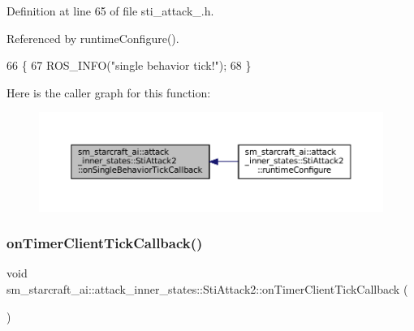 Definition at line 65 of file sti\+\_\+attack\+\_.\+h.



Referenced by runtime\+Configure().


\begin{DoxyCode}
66   \{
67     ROS\_INFO(\textcolor{stringliteral}{"single behavior tick!"});
68   \}
\end{DoxyCode}
Here is the caller graph for this function\+:
\nopagebreak
\begin{figure}[H]
\begin{center}
\leavevmode
\includegraphics[width=350pt]{structsm__starcraft__ai_1_1attack__inner__states_1_1StiAttack2_a3a78121d979d8bb7eb466707456a1aef_icgraph}
\end{center}
\end{figure}
\mbox{\label{structsm__starcraft__ai_1_1attack__inner__states_1_1StiAttack2_ab61b51291174e84b4ebf137101703e65}} 
\subsubsection{\texorpdfstring{on\+Timer\+Client\+Tick\+Callback()}{onTimerClientTickCallback()}}
{\footnotesize\ttfamily void sm\+\_\+starcraft\+\_\+ai\+::attack\+\_\+inner\+\_\+states\+::\+Sti\+Attack2\+::on\+Timer\+Client\+Tick\+Callback (\begin{DoxyParamCaption}{ }\end{DoxyParamCaption})\hspace{0.3cm}{\ttfamily [inline]}}




